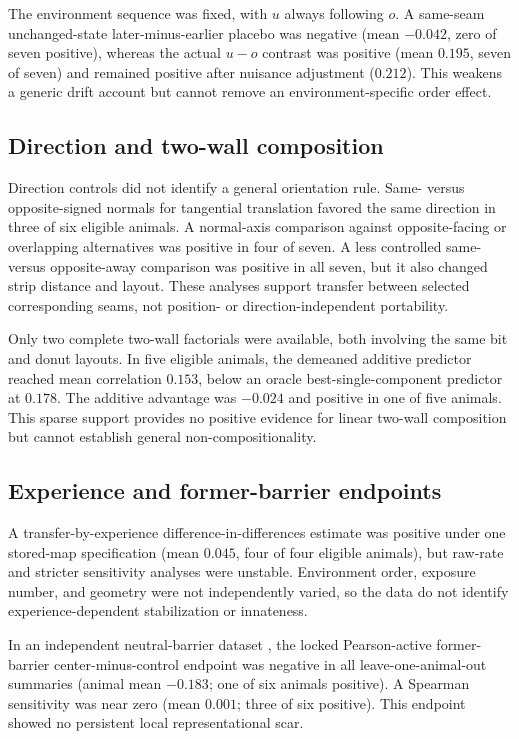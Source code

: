 \documentclass[10pt,twocolumn]{article}
\begin{document}
The environment sequence was fixed, with \(u\) always following \(o\). A
same-seam unchanged-state later-minus-earlier placebo was negative (mean
\(-0.042\), zero of seven positive), whereas the actual \(u-o\) contrast was
positive (mean \(0.195\), seven of seven) and remained positive after nuisance
adjustment (\(0.212\)). This weakens a generic drift account but cannot remove
an environment-specific order effect.

\subsection{Direction and two-wall composition}

Direction controls did not identify a general orientation rule. Same- versus
opposite-signed normals for tangential translation favored the same direction
in three of six eligible animals. A normal-axis comparison against
opposite-facing or overlapping alternatives was positive in four of seven. A
less controlled same- versus opposite-away comparison was positive in all
seven, but it also changed strip distance and layout. These analyses support
transfer between selected corresponding seams, not position- or
direction-independent portability.

Only two complete two-wall factorials were available, both involving the same
bit and donut layouts. In five eligible animals, the demeaned additive
predictor reached mean correlation \(0.153\), below an oracle
best-single-component predictor at \(0.178\). The additive advantage was
\(-0.024\) and positive in one of five animals. This sparse support provides no
positive evidence for linear two-wall composition but cannot establish general
non-compositionality.

\subsection{Experience and former-barrier endpoints}

A transfer-by-experience difference-in-differences estimate was positive under
one stored-map specification (mean \(0.045\), four of four eligible animals),
but raw-rate and stricter sensitivity analyses were unstable. Environment
order, exposure number, and geometry were not independently varied, so the
data do not identify experience-dependent stabilization or innateness.

In an independent neutral-barrier dataset \citep{BlairEtAl2023}, the locked
Pearson-active former-barrier center-minus-control endpoint was negative in all
leave-one-animal-out summaries (animal mean \(-0.183\); one of six animals
positive). A Spearman sensitivity was near zero (mean \(0.001\); three of six
positive). This endpoint showed no persistent local representational scar.
\end{document}

